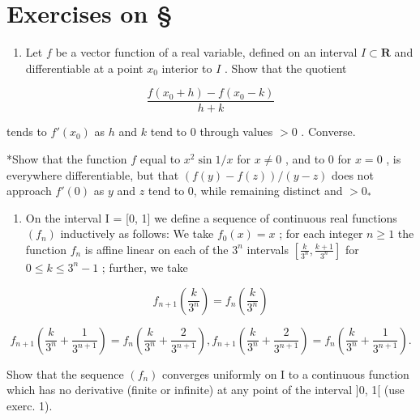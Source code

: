 \section*{Exercises on \S{}}
{}

\begin{enumerate}
\def\labelenumi{\arabic{enumi})}
\tightlist
\item
  Let \(f\) be a vector function of a real variable, defined on an interval \(I \subset \mathbf{R}\) and differentiable at a point \(x_0\) interior to \(I\) . Show that the quotient
\end{enumerate}

\[
\frac {f (x _ {0} + h) - f (x _ {0} - k)}{h + k}
\]

tends to \(f'(x_0)\) as \(h\) and \(k\) tend to 0 through values \(> 0\) . Converse.

*Show that the function \(f\) equal to \(x^2 \sin 1/x\) for \(x \neq 0\) , and to 0 for \(x = 0\) , is everywhere differentiable, but that \((f(y) - f(z)) / (y - z)\) does not approach \(f'(0)\) as \(y\) and \(z\) tend to 0, while remaining distinct and \(>0_*\)

\begin{enumerate}
\def\labelenumi{\arabic{enumi})}
\setcounter{enumi}{1}
\tightlist
\item
  On the interval I = {[}0, 1{]} we define a sequence of continuous real functions \((f_{n})\) inductively as follows: We take \(f_{0}(x) = x\) ; for each integer \(n \geqslant 1\) the function \(f_{n}\) is affine linear on each of the \(3^{n}\) intervals \(\left[\frac{k}{3^{n}}, \frac{k+1}{3^{n}}\right]\) for \(0 \leqslant k \leqslant 3^{n}-1\) ; further, we take
\end{enumerate}

\[
f _ {n + 1} \left(\frac {k}{3 ^ {n}}\right) = f _ {n} \left(\frac {k}{3 ^ {n}}\right)
\]

\[
f _ {n + 1} \left(\frac {k}{3 ^ {n}} + \frac {1}{3 ^ {n + 1}}\right) = f _ {n} \left(\frac {k}{3 ^ {n}} + \frac {2}{3 ^ {n + 1}}\right), f _ {n + 1} \left(\frac {k}{3 ^ {n}} + \frac {2}{3 ^ {n + 1}}\right) = f _ {n} \left(\frac {k}{3 ^ {n}} + \frac {1}{3 ^ {n + 1}}\right).
\]

Show that the sequence \((f_{n})\) converges uniformly on I to a continuous function which has no derivative (finite or infinite) at any point of the interval {]}0, 1{[} (use exerc. 1).

